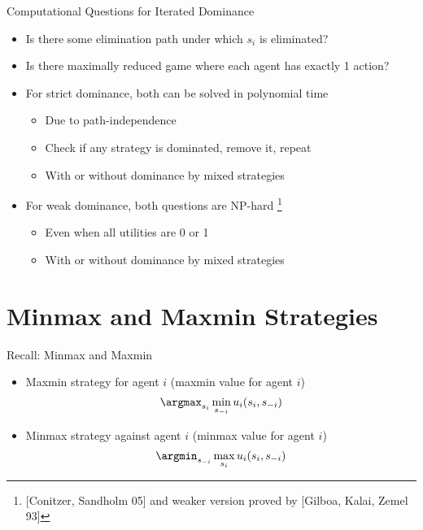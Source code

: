 \documentclass[11pt,aspectratio=169,handout]{beamer}
\begin{document}
   \begin{frame}{Computational Questions for Iterated Dominance}
    \begin{itemize}[<+->]
    \setlength{\itemsep}{1.2em}
     \item Is there some elimination path under which $s_i$ is eliminated?
     \item Is there maximally reduced game where each agent has exactly 1 action?
     \item For \alert{strict dominance}, both can be solved in polynomial time
     \begin{itemize}[<.->]
      \item Due to path-independence
      \item Check if any strategy is dominated, remove it, repeat
      \item With or without dominance by mixed strategies
     \end{itemize} 
     \item For \alert{weak dominance}, both questions are NP-hard%
      \footnote<4->{\scriptsize[Conitzer, Sandholm 05] and weaker version proved by [Gilboa, Kalai, Zemel 93]}
     \begin{itemize}[<.->]
      \item Even when all utilities are 0 or 1
      \item With or without dominance by mixed strategies
     \end{itemize}
    \end{itemize}
   \end{frame}
   
 \section{Minmax and Maxmin Strategies}
  \begin{frame}{Recall: Minmax and Maxmin}
   \begin{itemize}
    \item<1-> \alert{Maxmin} strategy for agent $i$ (maxmin value for agent $i$)
    $$
     \argmax_{s_i} \min_{s_{-i}} u_i(s_i, s_{-i})
    $$
    \item<2-> \alert{Minmax} strategy against agent $i$ (minmax value for agent $i$)
    $$
     \argmin_{s_{-i}} \max_{s_{i}} u_i(s_i, s_{-i})
    $$
   \end{itemize}
  \end{frame}
  
\end{document}
